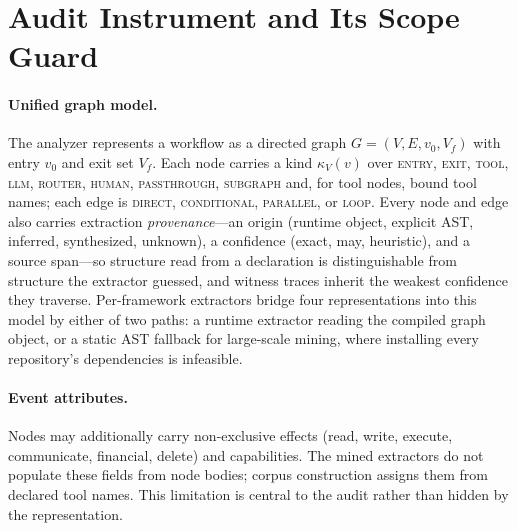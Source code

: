 \section{Audit Instrument and Its Scope Guard}
\label{sec:system}
\label{sec:graph_model}
\label{sec:verification_methods}


\paragraph{Unified graph model.}
The analyzer represents a workflow as a directed graph $G=(V,E,v_0,V_f)$ with
entry $v_0$ and exit set $V_f$. Each node carries a kind $\kappa_V(v)$ over
\textsc{entry}, \textsc{exit}, \textsc{tool}, \textsc{llm}, \textsc{router},
\textsc{human}, \textsc{passthrough}, \textsc{subgraph} and, for tool nodes,
bound tool names; each edge is \textsc{direct}, \textsc{conditional},
\textsc{parallel}, or \textsc{loop}. Every node and edge also carries extraction
\emph{provenance}---an origin (runtime object, explicit AST, inferred,
synthesized, unknown), a confidence (exact, may, heuristic), and a source
span---so structure read from a declaration is distinguishable from structure the
extractor guessed, and witness traces inherit the weakest confidence they
traverse. Per-framework extractors bridge four representations into this model
by either of two paths: a runtime extractor reading the compiled graph object,
or a static AST fallback for large-scale mining, where installing every
repository's dependencies is infeasible.

\paragraph{Event attributes.}
\label{par:ontology}
Nodes may additionally carry non-exclusive effects (read, write, execute,
communicate, financial, delete) and capabilities. The mined extractors do not
populate these fields from node bodies; corpus construction assigns them from
declared tool names. This limitation is central to the audit rather than hidden
by the representation.

